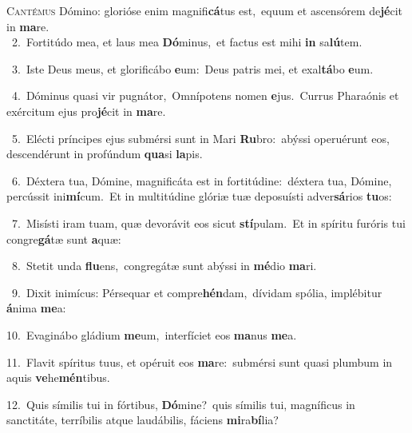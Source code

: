 \lettrine{\initial\textcolor{\initialcolor}{C}}{antémus} Dómino: glorióse enim magnifi\-\textbf{cá}\-tus est,~\star equum et ascensórem de\-\textbf{jé}\-cit in \textbf{ma}\-re.\\
{\numbfont\textcolor{\numbcolor}{~2.}}~Fortitúdo mea, et laus mea \textbf{Dó}\-minus,~\star et factus est mihi \textbf{in} sa\-\textbf{lú}\-tem.\par
{\numbfont\textcolor{\numbcolor}{~3.}}~Iste Deus meus, et glorificábo \textbf{e}\-um:~\star Deus patris mei, et exal\-\textbf{tá}\-bo \textbf{e}\-um.\par
{\numbfont\textcolor{\numbcolor}{~4.}}~Dóminus quasi vir pugnátor,~\dagger Omnípotens nomen \textbf{e}\-jus.~\star Currus Pharaónis et exércitum ejus pro\-\textbf{jé}\-cit in \textbf{ma}\-re.\par
{\numbfont\textcolor{\numbcolor}{~5.}}~Elécti príncipes ejus submérsi sunt in Mari \textbf{Ru}\-bro:~\star abýssi operuérunt eos, descendérunt in profúndum \textbf{qua}\-si \textbf{la}\-pis.\par
{\numbfont\textcolor{\numbcolor}{~6.}}~Déxtera tua, Dómine, magnificáta est in fortitúdine:~\dagger déxtera tua, Dómine, percússit ini\-\textbf{mí}\-cum.~\star Et in multitúdine glóriæ tuæ deposuísti adver\-\textbf{sá}\-rios \textbf{tu}\-os:\par
{\numbfont\textcolor{\numbcolor}{~7.}}~Misísti iram tuam, quæ devorávit eos sicut \textbf{stí}\-pulam.~\star Et in spíritu furóris tui congre\-\textbf{gá}\-tæ sunt \textbf{a}\-quæ:\par
{\numbfont\textcolor{\numbcolor}{~8.}}~Stetit unda \textbf{flu}\-ens,~\star congregátæ sunt abýssi in \textbf{mé}\-dio \textbf{ma}\-ri.\par
{\numbfont\textcolor{\numbcolor}{~9.}}~Dixit inimícus: Pérsequar et compre\-\textbf{hén}\-dam,~\star dívidam spólia, implébitur \textbf{á}\-nima \textbf{me}\-a:\par
{\numbfont\textcolor{\numbcolor}{10.}}~Evaginábo gládium \textbf{me}\-um,~\star interfíciet eos \textbf{ma}\-nus \textbf{me}\-a.\par
{\numbfont\textcolor{\numbcolor}{11.}}~Flavit spíritus tuus, et opéruit eos \textbf{ma}\-re:~\star submérsi sunt quasi plumbum in aquis \textbf{ve}\-he\-\textbf{mén}\-tibus.\par
{\numbfont\textcolor{\numbcolor}{12.}}~Quis símilis tui in fórtibus, \textbf{Dó}\-mine?~\star quis símilis tui, magníficus in sanctitáte, terríbilis atque laudábilis, fáciens \textbf{mi}\-ra\-\textbf{bí}\-lia?\par

